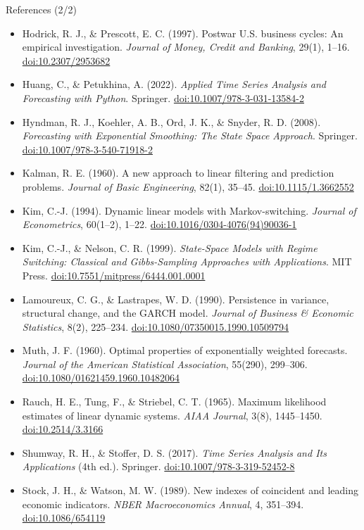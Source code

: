 \begin{frame}{References (2/2)}
\itemsize{\scriptsize}
\begin{itemize}
    \item Hodrick, R. J., \& Prescott, E. C. (1997). Postwar U.S. business cycles: An empirical investigation. \textit{Journal of Money, Credit and Banking}, 29(1), 1--16. \href{https://doi.org/10.2307/2953682}{doi:10.2307/2953682}
    \item Huang, C., \& Petukhina, A. (2022). \textit{Applied Time Series Analysis and Forecasting with Python}. Springer. \href{https://doi.org/10.1007/978-3-031-13584-2}{doi:10.1007/978-3-031-13584-2}
    \item Hyndman, R. J., Koehler, A. B., Ord, J. K., \& Snyder, R. D. (2008). \textit{Forecasting with Exponential Smoothing: The State Space Approach}. Springer. \href{https://doi.org/10.1007/978-3-540-71918-2}{doi:10.1007/978-3-540-71918-2}
    \item Kalman, R. E. (1960). A new approach to linear filtering and prediction problems. \textit{Journal of Basic Engineering}, 82(1), 35--45. \href{https://doi.org/10.1115/1.3662552}{doi:10.1115/1.3662552}
    \item Kim, C.-J. (1994). Dynamic linear models with Markov-switching. \textit{Journal of Econometrics}, 60(1--2), 1--22. \href{https://doi.org/10.1016/0304-4076(94)90036-1}{doi:10.1016/0304-4076(94)90036-1}
    \item Kim, C.-J., \& Nelson, C. R. (1999). \textit{State-Space Models with Regime Switching: Classical and Gibbs-Sampling Approaches with Applications}. MIT Press. \href{https://doi.org/10.7551/mitpress/6444.001.0001}{doi:10.7551/mitpress/6444.001.0001}
    \item Lamoureux, C. G., \& Lastrapes, W. D. (1990). Persistence in variance, structural change, and the GARCH model. \textit{Journal of Business \& Economic Statistics}, 8(2), 225--234. \href{https://doi.org/10.1080/07350015.1990.10509794}{doi:10.1080/07350015.1990.10509794}
    \item Muth, J. F. (1960). Optimal properties of exponentially weighted forecasts. \textit{Journal of the American Statistical Association}, 55(290), 299--306. \href{https://doi.org/10.1080/01621459.1960.10482064}{doi:10.1080/01621459.1960.10482064}
    \item Rauch, H. E., Tung, F., \& Striebel, C. T. (1965). Maximum likelihood estimates of linear dynamic systems. \textit{AIAA Journal}, 3(8), 1445--1450. \href{https://doi.org/10.2514/3.3166}{doi:10.2514/3.3166}
    \item Shumway, R. H., \& Stoffer, D. S. (2017). \textit{Time Series Analysis and Its Applications} (4th ed.). Springer. \href{https://doi.org/10.1007/978-3-319-52452-8}{doi:10.1007/978-3-319-52452-8}
    \item Stock, J. H., \& Watson, M. W. (1989). New indexes of coincident and leading economic indicators. \textit{NBER Macroeconomics Annual}, 4, 351--394. \href{https://doi.org/10.1086/654119}{doi:10.1086/654119}
\end{itemize}
\end{frame}


